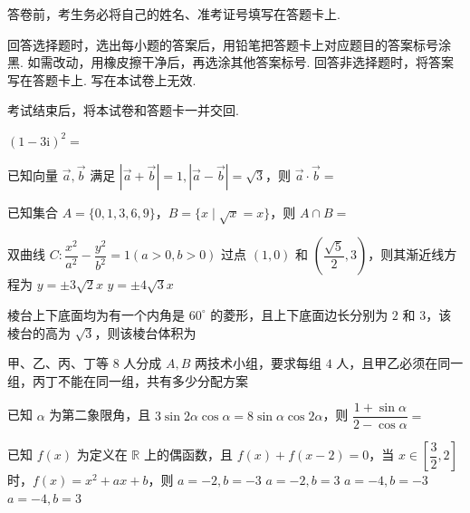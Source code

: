 \documentclass[a4paper,11pt]{report}
\begin{document}
\examfontsize



\noticetitle
\begin{examnotice}
\item 答卷前，考生务必将自己的姓名、准考证号填写在答题卡上. 
\item 回答选择题时，选出每小题的答案后，用铅笔把答题卡上对应题目的答案标号涂黑. 如需改动，用橡皮擦干净后，再选涂其他答案标号. 回答非选择题时，将答案写在答题卡上. 写在本试卷上无效. 
\item 考试结束后，将本试卷和答题卡一并交回. 
\end{examnotice}

\begin{examquestions}
\item $(1-3\mathrm{i})^2=$

\item 已知向量 $\vec a,\vec b$ 满足 $|\vec a+\vec b|=1,|\vec a-\vec b|=\sqrt3$，则 $\vec a\cdot\vec b=$
\fourchoices
{}
{}
{}
{}

\item 已知集合 $A=\{0,1,3,6,9\}$，$B=\{x\mid \sqrt{x}=x\}$，则 $A\cap B=$

\item 双曲线 $C:\dfrac{x^2}{a^2}-\dfrac{y^2}{b^2}=1(a>0,b>0)$ 过点 $(1,0)$ 和 $\left(\dfrac{\sqrt5}{2},3\right)$，则其渐近线方程为
\fourchoices
{$y=\pm3\sqrt2x$}
{$y=\pm4\sqrt3x$}
{}
{}

\item 棱台上下底面均为有一个内角是 $60^\circ$ 的菱形，且上下底面边长分别为 $2$ 和 $3$，该棱台的高为 $\sqrt3$，则该棱台体积为
\fourchoices
{}
{}
{}
{}

\item 甲、乙、丙、丁等 $8$ 人分成 $A,B$ 两技术小组，要求每组 $4$ 人，且甲乙必须在同一组，丙丁不能在同一组，共有多少分配方案
\newpage
\item 已知 $\alpha$ 为第二象限角，且 $3\sin2\alpha\cos\alpha=8\sin\alpha\cos2\alpha$，则 $\dfrac{1+\sin\alpha}{2-\cos\alpha}=$
\fourchoices
{}
{}
{}
{}

\item 已知 $f(x)$ 为定义在 $\mathbb R$ 上的偶函数，且 $f(x)+f(x-2)=0$，当 $x\in\left[\dfrac32,2\right]$ 时，$f(x)=x^2+ax+b$，则
\twochoices
{$a=-2,b=-3$}
{$a=-2,b=3$}
{$a=-4,b=-3$}
{$a=-4,b=3$}
\end{examquestions}
\end{document}

